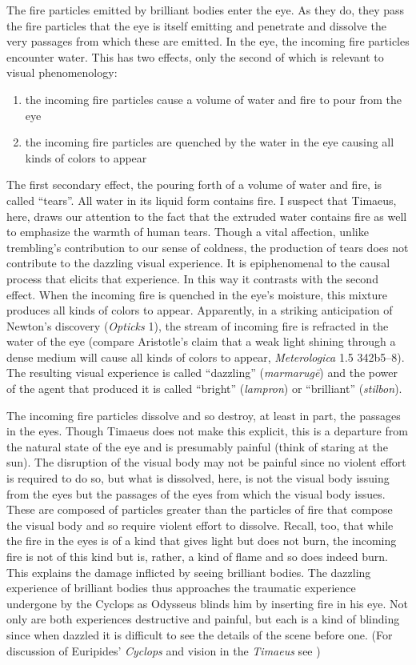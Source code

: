 The fire particles emitted by brilliant bodies enter the eye. As they do, they pass the fire particles that the eye is itself emitting and penetrate and dissolve the very passages from which these are emitted. In the eye, the incoming fire particles encounter water. This has two effects, only the second of which is relevant to visual phenomenology:
\begin{enumerate}
	\item the incoming fire particles cause a volume of water and fire to pour from the eye
	\item the incoming fire particles are quenched by the water in the eye causing all kinds of colors to appear
\end{enumerate}
The first secondary effect, the pouring forth of a volume of water and fire, is called ``tears''. All water in its liquid form contains fire. I suspect that Timaeus, here, draws our attention to the fact that the extruded water contains fire as well to emphasize the warmth of human tears. Though a vital affection, unlike trembling's contribution to our sense of coldness, the production of tears does not contribute to the dazzling visual experience. It is epiphenomenal to the causal process that elicits that experience. In this way it contrasts with the second effect. When the incoming fire is quenched in the eye's moisture, this mixture produces all kinds of colors to appear. Apparently, in a striking anticipation of Newton's discovery (\emph{Opticks} 1), the stream of incoming fire is refracted in the water of the eye (compare Aristotle's claim that a weak light shining through a dense medium will cause all kinds of colors to appear, \emph{Meterologica} 1.5 342b5--8). The resulting visual experience is called ``dazzling'' (\emph{marmarugē}) and the power of the agent that produced it is called ``bright''  (\emph{lampron}) or ``brilliant'' (\emph{stilbon}). 

The incoming fire particles dissolve and so destroy, at least in part, the passages in the eyes. Though Timaeus does not make this explicit, this is a departure from the natural state of the eye and is presumably painful (think of staring at the sun). The disruption of the visual body may not be painful since no violent effort is required to do so, but what is dissolved, here, is not the visual body issuing from the eyes but the passages of the eyes from which the visual body issues. These are composed of particles greater than the particles of fire that compose the visual body and so require violent effort to dissolve. Recall, too, that while the fire in the eyes is of a kind that gives light but does not burn, the incoming fire is not of this kind but is, rather, a kind of flame and so does indeed burn. This explains the damage inflicted by seeing brilliant bodies. The dazzling experience of brilliant bodies thus approaches the traumatic experience undergone by the Cyclops as Odysseus blinds him by inserting fire in his eye. Not only are both experiences destructive and painful, but each is a kind of blinding since when dazzled it is difficult to see the details of the scene before one. (For discussion of Euripides' \emph{Cyclops} and vision in the \emph{Timaeus} see \citealt[114]{Johansen:2004dx})

